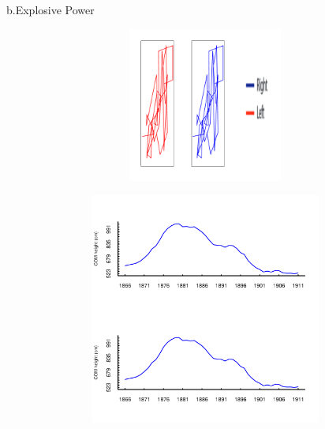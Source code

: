 \documentclass{article}\usepackage[]{graphicx}\usepackage[]{color}
\newenvironment{knitrout}{}{} %
\begin{document}
\newpage
b.Explosive Power

\begin{knitrout}
\color{fgcolor}

\includegraphics[width=6in,height=2in]{figure/latex-unnamed-chunk-15-1} \hfill{}



\end{knitrout}
\begin{knitrout}
\color{fgcolor}

\includegraphics[width=6in,height=3in]{figure/latex-unnamed-chunk-16-1} \hfill{}



\end{knitrout}
\end{document}
